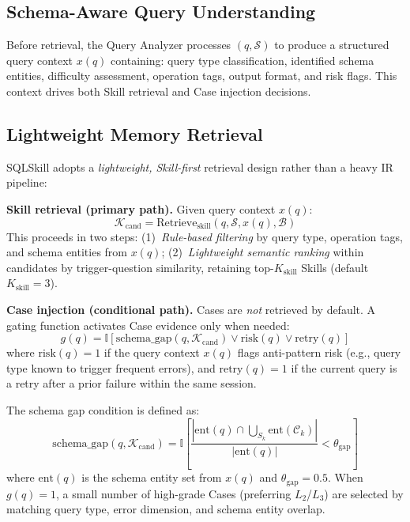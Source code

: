 \subsection{Schema-Aware Query Understanding}
\label{subsec:query_understanding}

Before retrieval, the Query Analyzer processes $(q, \mathcal{S})$ to produce a structured query context $x(q)$ containing: query type classification, identified schema entities, difficulty assessment, operation tags, output format, and risk flags. This context drives both Skill retrieval and Case injection decisions.

\subsection{Lightweight Memory Retrieval}
\label{subsec:retrieval}

SQLSkill adopts a \emph{lightweight, Skill-first} retrieval design rather than a heavy IR pipeline:

\textbf{Skill retrieval (primary path).} Given query context $x(q)$:
\begin{equation}
  \mathcal{K}_{\text{cand}} = \text{Retrieve}_{\text{skill}}(q, \mathcal{S}, x(q), \mathcal{B})
\end{equation}
This proceeds in two steps: (1)~\emph{Rule-based filtering} by query type, operation tags, and schema entities from $x(q)$; (2)~\emph{Lightweight semantic ranking} within candidates by trigger-question similarity, retaining top-$K_{\text{skill}}$ Skills (default $K_{\text{skill}}=3$).

\textbf{Case injection (conditional path).} Cases are \emph{not} retrieved by default. A gating function activates Case evidence only when needed:
\begin{equation}
  g(q) = \mathbb{I}\!\left[\text{schema\_gap}(q, \mathcal{K}_{\text{cand}}) \vee \text{risk}(q) \vee \text{retry}(q)\right]
\end{equation}
where $\text{risk}(q) = 1$ if the query context $x(q)$ flags anti-pattern risk (e.g., query type known to trigger frequent errors), and $\text{retry}(q) = 1$ if the current query is a retry after a prior failure within the same session.

The schema gap condition is defined as:
\begin{equation}
  \text{schema\_gap}(q, \mathcal{K}_{\text{cand}}) = \mathbb{I}\!\left[\frac{|\text{ent}(q) \cap \bigcup_{S_k} \text{ent}(\mathcal{C}_k)|}{|\text{ent}(q)|} < \theta_{\text{gap}}\right]
\end{equation}
where $\text{ent}(q)$ is the schema entity set from $x(q)$ and $\theta_{\text{gap}} = 0.5$. When $g(q)=1$, a small number of high-grade Cases (preferring $L_2$/$L_3$) are selected by matching query type, error dimension, and schema entity overlap.

